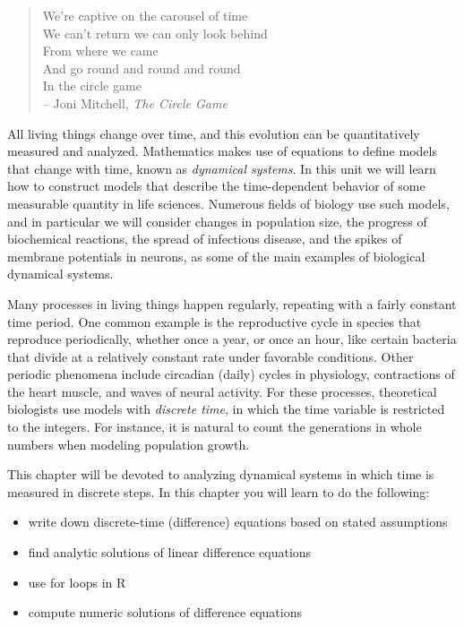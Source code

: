 \documentclass[
  letterpaper,
  DIV=11,
  numbers=noendperiod]{scrreprt}
\begin{document}

\begin{quote}
We're captive on the carousel of time\\
We can't return we can only look behind\\
From where we came\\
And go round and round and round\\
In the circle game\\
-- Joni Mitchell, \emph{The Circle Game}
\end{quote}

All living things change over time, and this evolution can be
quantitatively measured and analyzed. Mathematics makes use of equations
to define models that change with time, known as
 \emph{dynamical systems}. In this unit we
will learn how to construct models that describe the time-dependent
behavior of some measurable quantity in life sciences. Numerous fields
of biology use such models, and in particular we will consider changes
in population size, the progress of biochemical reactions, the spread of
infectious disease, and the spikes of membrane potentials in neurons, as
some of the main examples of biological dynamical systems.

Many processes in living things happen regularly, repeating with a
fairly constant time period. One common example is the reproductive
cycle in species that reproduce periodically, whether once a year, or
once an hour, like certain bacteria that divide at a relatively constant
rate under favorable conditions. Other periodic phenomena include
circadian (daily) cycles in physiology, contractions of the heart
muscle, and waves of neural activity. For these processes, theoretical
biologists use models with  \emph{discrete
time}, in which the time variable is restricted to the integers. For
instance, it is natural to count the generations in whole numbers when
modeling population growth.

This chapter will be devoted to analyzing dynamical systems in which
time is measured in discrete steps. In this chapter you will learn to do
the following:

\begin{itemize}
\item
  write down discrete-time (difference) equations based on stated
  assumptions
\item
  find analytic solutions of linear difference equations
\item
  use for loops in R
\item
  compute numeric solutions of difference equations
\end{itemize}
\end{document}
